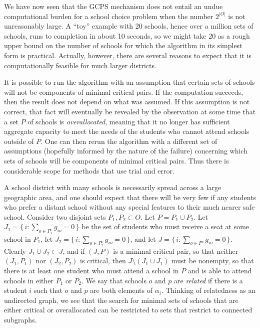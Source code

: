 \documentclass[12pt]{article}
\theoremstyle{definition}
\begin{document}
We have now seen that the GCPS mechanism does not entail an undue computational burden for a school choice problem when the number $2^{|O|}$ is not unreasonably large.  A ``toy'' example with 20 schools, hence over a million sets of schools, runs to completion in about 10 seconds, so we might take 20 as a rough upper bound on the number of schools for which the algorithm in its simplest form is practical.  Actually, however, there are several reasons to expect that it is computationally feasible for much larger districts.

It is possible to run the algorithm with an assumption that certain sets of schools will not be components of minimal critical pairs.  If the computation succeeds, then the result does not depend on what was assumed.  If this assumption is not correct, that fact will eventually be revealed by the observation at some time that a set $P$ of schools is \textit{overallocated}, meaning that it no longer has sufficient aggregate capacity to meet the needs of the students who cannot attend schools outside of $P$.  One can then rerun the algorithm with a different set of assumptions (hopefully informed by the nature of the failure) concerning which sets of schools will be components of minimal critical pairs.  Thus there is considerable scope for methods that use trial and error.

A school district with many schools is necessarily spread across a large geographic area, and one should expect that there will be very few if any students who prefer a distant school without any special features to their much nearer safe school.  
Consider two disjoint sets $P_1, P_2 \subset O$.  Let $P = P_1 \cup P_2$. Let $J_1 = \{\, i : \sum_{o \in P_1^c} g_{io} = 0 \,\}$ be the set of students who must receive a seat at some school in $P_1$, let $J_2 = \{\, i : \sum_{o \in P_2^c} g_{io} = 0 \,\}$, and let $J = \{\, i : \sum_{o \in P^c} g_{io}  = 0\,\}$.   Clearly $J_1 \cup J_2 \subset J$, and if $(J,P)$ is a minimal critical pair, so that neither $(J_1,P_1)$ nor $(J_2,P_2)$ is critical, then $J \setminus (J_1 \cup J_1)$ must be nonempty, so that there is at least one student who must attend a school in $P$ and is able to attend schools in either $P_1$ or $P_2$.  We say that schools $o$ and $p$ are \emph{related} if there is a student $i$ such that $o$ and $p$ are both elements of $\alpha_i$.  Thinking of relatedness as an undirected graph, we see that the search for minimal sets of schools that are either critical or overallocated can be restricted to sets that restrict to connected subgraphs.
\end{document}
